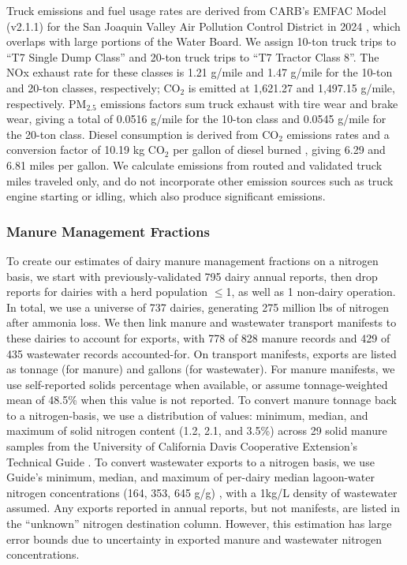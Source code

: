 \documentclass{iopjournal}
\begin{document}
Truck emissions and fuel usage rates are derived from CARB's EMFAC Model (v2.1.1) for the San Joaquin Valley Air Pollution Control District in 2024 \cite{EMFAC_Emissions}, which overlaps with large portions of the Water Board. We assign 10-ton truck trips to ``T7 Single Dump Class'' and 20-ton truck trips to  ``T7 Tractor Class 8''. The NOx exhaust rate for these classes is 1.21 g/mile and 1.47 g/mile for the 10-ton and 20-ton classes, respectively; $\text{CO}_2$ is emitted at 1,621.27 and 1,497.15 g/mile, respectively. $\text{PM}_{2.5}$ emissions factors sum truck exhaust with tire wear and brake wear, giving a total of 0.0516 g/mile for the 10-ton class and 0.0545 g/mile for the 20-ton class. Diesel consumption is derived from $\text{CO}_2$ emissions rates and a conversion factor of 10.19 kg $\text{CO}_2$ per gallon of diesel burned \cite{EIA_CO2_per_gal}, giving 6.29 and 6.81 miles per gallon. We calculate emissions from routed and validated truck miles traveled only, and do not incorporate other emission sources such as truck engine starting or idling, which also produce significant emissions.

\subsubsection{Manure Management Fractions}

To create our estimates of dairy manure management fractions on a nitrogen basis, we start with previously-validated 795 dairy annual reports, then drop reports for dairies with a herd population $\le$1, as well as 1 non-dairy operation. In total, we use a universe of 737 dairies, generating 275 million lbs of nitrogen after ammonia loss. We then link manure and wastewater transport manifests to these dairies to account for exports, with 778 of 828 manure records and 429 of 435 wastewater records accounted-for. On transport manifests, exports are listed as tonnage (for manure) and gallons (for wastewater). For manure manifests, we use self-reported solids percentage when available, or assume tonnage-weighted mean of 48.5\% when this value is not reported. To convert manure tonnage back to a nitrogen-basis, we use a distribution of values: minimum, median, and maximum of solid nitrogen content (1.2, 2.1, and 3.5\%) across 29 solid manure samples from the University of California Davis Cooperative Extension's Technical Guide \cite{Davis_Tech_Guide}. To convert wastewater exports to a nitrogen basis, we use Guide's minimum, median, and maximum of per-dairy median lagoon-water nitrogen concentrations (164, 353, 645 \textmu{}g/g)  \cite{Davis_Tech_Guide} , with a 1kg/L density of wastewater assumed. Any exports reported in annual reports, but not manifests, are listed in the ``unknown'' nitrogen destination column. However, this estimation has large error bounds due to uncertainty in exported manure and wastewater nitrogen concentrations.
\end{document}
